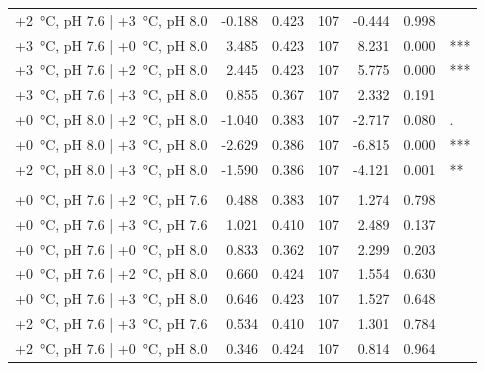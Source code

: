 \documentclass[a4paper,10pt, oneside]{memoir}
\begin{document}
\begin{table}[tb]
\begin{tabular}[t]{lrrrrrl}
\hspace{1em}+\SI{2}{\celsius}, pH 7.6 | +\SI{3}{\celsius}, pH 8.0 & -0.188 & 0.423 & 107 & -0.444 & 0.998 & \\
\hspace{1em}+\SI{3}{\celsius}, pH 7.6 | +\SI{0}{\celsius}, pH 8.0 & 3.485 & 0.423 & 107 & 8.231 & 0.000 & ***\\
\hspace{1em}+\SI{3}{\celsius}, pH 7.6 | +\SI{2}{\celsius}, pH 8.0 & 2.445 & 0.423 & 107 & 5.775 & 0.000 & ***\\
\hspace{1em}+\SI{3}{\celsius}, pH 7.6 | +\SI{3}{\celsius}, pH 8.0 & 0.855 & 0.367 & 107 & 2.332 & 0.191 & \\
\hspace{1em}+\SI{0}{\celsius}, pH 8.0 | +\SI{2}{\celsius}, pH 8.0 & -1.040 & 0.383 & 107 & -2.717 & 0.080 & .\\
\hspace{1em}+\SI{0}{\celsius}, pH 8.0 | +\SI{3}{\celsius}, pH 8.0 & -2.629 & 0.386 & 107 & -6.815 & 0.000 & ***\\
\hspace{1em}+\SI{2}{\celsius}, pH 8.0 | +\SI{3}{\celsius}, pH 8.0 & -1.590 & 0.386 & 107 & -4.121 & 0.001 & **\\
\addlinespace[0.3em]
\multicolumn{7}{l}{\textit{12 weeks}}\\
\hspace{1em}+\SI{0}{\celsius}, pH 7.6 | +\SI{2}{\celsius}, pH 7.6 & 0.488 & 0.383 & 107 & 1.274 & 0.798 & \\
\hspace{1em}+\SI{0}{\celsius}, pH 7.6 | +\SI{3}{\celsius}, pH 7.6 & 1.021 & 0.410 & 107 & 2.489 & 0.137 & \\
\hspace{1em}+\SI{0}{\celsius}, pH 7.6 | +\SI{0}{\celsius}, pH 8.0 & 0.833 & 0.362 & 107 & 2.299 & 0.203 & \\
\hspace{1em}+\SI{0}{\celsius}, pH 7.6 | +\SI{2}{\celsius}, pH 8.0 & 0.660 & 0.424 & 107 & 1.554 & 0.630 & \\
\hspace{1em}+\SI{0}{\celsius}, pH 7.6 | +\SI{3}{\celsius}, pH 8.0 & 0.646 & 0.423 & 107 & 1.527 & 0.648 & \\
\hspace{1em}+\SI{2}{\celsius}, pH 7.6 | +\SI{3}{\celsius}, pH 7.6 & 0.534 & 0.410 & 107 & 1.301 & 0.784 & \\
\hspace{1em}+\SI{2}{\celsius}, pH 7.6 | +\SI{0}{\celsius}, pH 8.0 & 0.346 & 0.424 & 107 & 0.814 & 0.964 & \\

\end{tabular}
\end{table}
\end{document}
